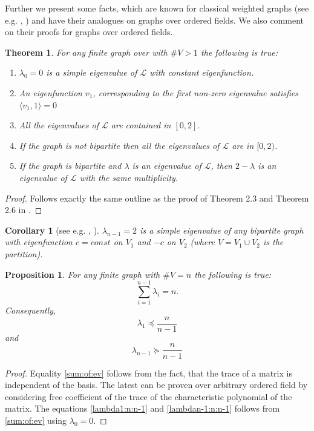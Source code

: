 \documentclass[a4paper,12pt]{amsart}
\newtheorem{theorem}{Theorem}
\newtheorem{proposition}{Proposition}
\newtheorem{corollary}{Corollary}
\theoremstyle{definition}
\begin{document}
Further we present some facts, which are known for classical weighted graphs (see e.g. \cite{Chung}, \cite{Grigoryan}) and have their analogues on graphs over ordered fields. We also comment on their proofs for graphs over ordered fields.
\begin{theorem}\label{thm1}
For any finite graph over with $\#V>1$ the following is true:
\begin{enumerate}
\item
$\lambda_0=0$ is a simple eigenvalue of $\mathcal L$ with constant eigenfunction.
\item
An eigenfunction $v_1$, corresponding to the first non-zero eigenvalue satisfies $\langle v_1,1\rangle=0$
\item
All the eigenvalues of $\mathcal L$ are contained in $[0,2]$.
\item
If the graph is not bipartite then all the eigenvalues of $\mathcal L$ are in $[0,2)$.
\item
If the graph is bipartite and $\lambda$ is an eigenvalue of $\mathcal L$, then $2-\lambda$ is an eigenvalue of $\mathcal L$ with the same multiplicity.  
\end{enumerate}
\end{theorem}
\begin{proof}
Follows exactly the same outline as the proof of Theorem 2.3 and Theorem 2.6 in \cite{Grigoryan}.
\end{proof}



\begin{corollary}[see e.g. \cite{Chung}, \cite{Grigoryan}]
$\lambda_{n-1}=2$ is a simple eigenvalue of any bipartite graph with eigenfunction $c=const$ on $V_1$ and $-c$ on $V_2$ (where $V=V_1\cup V_2$ is the partition).
\end{corollary}


\begin{proposition}\label{Prop1}
For any finite graph with $\#V=n$ the following is true:
\begin{equation}\label{sum:of:ev}
\sum_{i=1}^{n-1} \lambda_i = n.
\end{equation}
Consequently,
\begin{equation}\label{lambda1:n:n-1}
\lambda_1\preceq\dfrac{n}{n-1}
\end{equation}
and
\begin{equation}\label{lambdan-1:n:n-1}
\lambda_{n-1}\succeq\dfrac{n}{n-1}
\end{equation}
\end{proposition}
\begin{proof}
Equality \eqref{sum:of:ev} follows from the fact, that the trace of a matrix is independent of the basis. The latest can be proven over arbitrary ordered field by considering free coefficient of the trace of the characteristic polynomial of the matrix.
The equations \eqref{lambda1:n:n-1} and \eqref{lambdan-1:n:n-1} follows from \eqref{sum:of:ev} using $\lambda_ 0=0$.
\end{proof}
\end{document}

